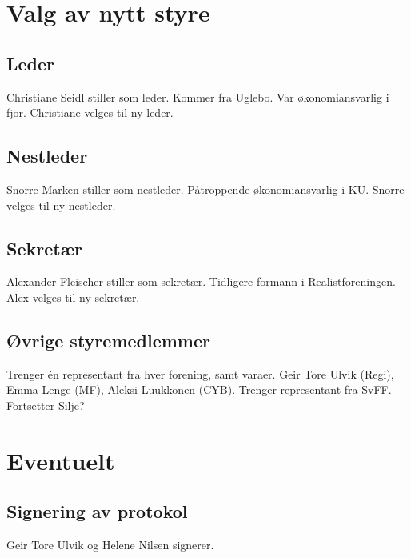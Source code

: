 \documentclass{article}[12pt]
\begin{document}
  \section{Valg av nytt styre}
    \subsection{Leder}
      Christiane Seidl stiller som leder.
      Kommer fra Uglebo.
      Var økonomiansvarlig i fjor.
      Christiane velges til ny leder.

    \subsection{Nestleder}
      Snorre Marken stiller som nestleder.
      Påtroppende økonomiansvarlig i KU.
      Snorre velges til ny nestleder.

    \subsection{Sekretær}
      Alexander Fleischer stiller som sekretær.
      Tidligere formann i Realistforeningen.
      Alex velges til ny sekretær.

    \subsection{Øvrige styremedlemmer}
      Trenger én representant fra hver forening, samt varaer.
      Geir Tore Ulvik (Regi), Emma Lenge (MF), 
      Aleksi Luukkonen (CYB). 
      Trenger representant fra SvFF. Fortsetter Silje?

  \section{Eventuelt} 
    \subsection{Signering av protokol}
      Geir Tore Ulvik og Helene Nilsen signerer.
\end{document}
